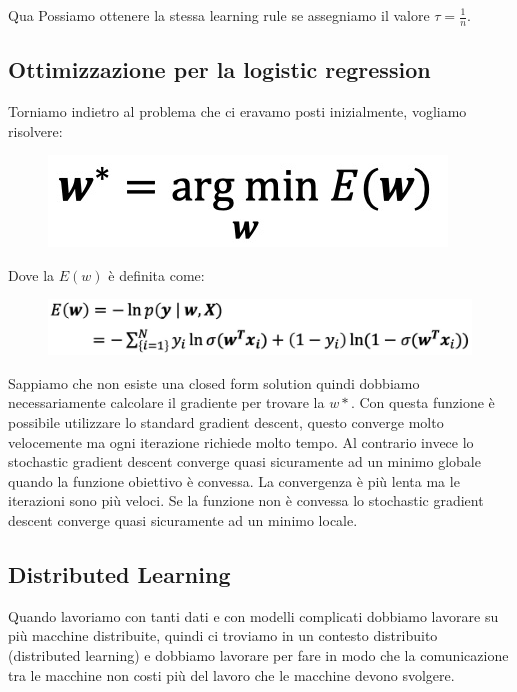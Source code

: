 \documentclass[14pt]{extreport}
\begin{document}
Qua Possiamo ottenere la stessa learning rule se assegniamo il valore $\tau=\frac{1}{n}$.

\subsection{Ottimizzazione per la logistic regression}

Torniamo indietro al problema che ci eravamo posti inizialmente, vogliamo risolvere:

\begin{figure}[H]
\centering
\includegraphics[width=0.7\linewidth]{270.jpeg}
\end{figure}

Dove la $E(w)$ è definita come:

\begin{figure}[H]
\centering
\includegraphics[width=0.7\linewidth]{271.jpeg}
\end{figure}
 
Sappiamo che non esiste una closed form solution quindi dobbiamo necessariamente calcolare il gradiente per trovare la $w*$. Con questa funzione è
possibile utilizzare lo standard gradient descent, questo converge molto velocemente ma ogni iterazione richiede molto tempo. Al contrario invece lo
stochastic gradient descent converge quasi sicuramente ad un minimo globale quando la funzione obiettivo è convessa. La convergenza è più lenta ma le
iterazioni sono più veloci. Se la funzione non è convessa lo stochastic gradient descent converge quasi sicuramente ad un minimo locale.

\subsection{Distributed Learning}

Quando lavoriamo con tanti dati e con modelli complicati dobbiamo lavorare su più macchine distribuite, quindi ci troviamo in un contesto distribuito
(distributed learning) e dobbiamo lavorare per fare in modo che la comunicazione tra le macchine non costi più del lavoro che le macchine devono
svolgere.
\end{document}

